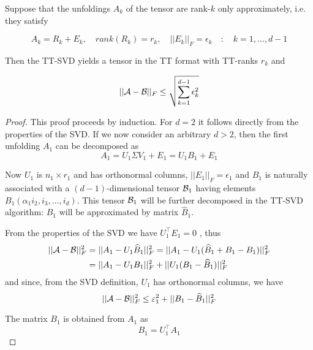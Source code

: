 \begin{Teo} \label{teo:ttsvd_approx}
  Suppose that the unfoldings $A_k$ of the tensor \A are rank-$k$ only approximately, i.e. they satisfy

  \begin{equation} \label{teo:ttsvd_approx:ip:1}
  A_k = R_k + E_k, \quad rank(R_k) = r_k, \quad ||E_k||_F = \epsilon_k \quad:\quad k = 1,\ldots,d-1
  \end{equation}

  Then the TT-SVD yields a tensor \B in the TT format with TT-ranks $r_k$ and

  \begin{equation}
    ||\mathcal{A} - \mathcal{B} ||_F \le \sqrt{\sum_{k=1}^{d-1} \epsilon_k^2}
  \end{equation}
  
  \begin{proof}
    This proof proceeds by induction. For $d=2$ it follows directly from the properties of the SVD. If we now consider an arbitrary $d > 2$, then the first unfolding $A_1$ can be decomposed as
    \[
    A_1 = U_1 \Sigma V_1 + E_1 = U_1 B_1 + E_1
    \]

    Now $U_1$ is $n_1 \times r_1$ and has orthonormal columns, $||E_1||_F = \epsilon_1$ and $B_1$ is naturally associated with a $(d-1)$-dimensional tensor $\mathcal{B}_1$ having elements $B_1(\alpha_1i_2,i_3,\ldots,i_d)$. This tensor $\mathcal{B}_1$ will be further decomposed in the TT-SVD algorithm: $B_1$ will be approximated by matrix $\hat{B}_1$.

    From the properties of the SVD we have $U_1^\top E_1 = 0$  , thus
    \begin{equation*}
      \begin{split}
        ||\mathcal{A}-\mathcal{B}||_F^2 &= ||A_1 - U_1\widehat{B}_1||_F^2 = ||A_1 - U_1(\widehat{B}_1 + B_1 - B_1)||_F^2 \\
         &= ||A_1 - U_1 B_1||_F^2 + ||U_1(B_1 - \widehat{B}_1)||_F^2
      \end{split}
    \end{equation*}
    and since, from the SVD definition, $U_1$ has orthonormal columns, we have
    \begin{equation} \label{teo:ttsvd_approx:proof:bound}
      ||\mathcal{A} - \mathcal{B}||_F^2 \le \varepsilon_1^2 + ||B_1 - \widehat{B}_1 ||_F^2
    \end{equation}

    The matrix $B_1$ is obtained from $A_1$ as
    \[
    B_1 = U_1^\top A_1
    \]


\end{proof}
\end{Teo}
